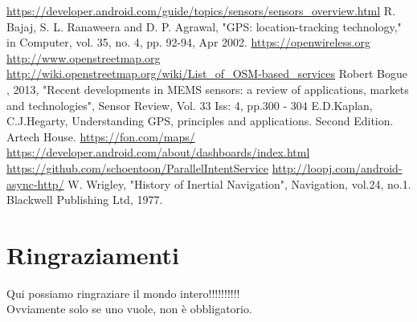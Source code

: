 \documentclass[12pt,a4paper,openright,twoside]{report}
\begin{document}
\begin{thebibliography}{90}
 \url{https://developer.android.com/guide/topics/sensors/sensors_overview.html}
 R. Bajaj, S. L. Ranaweera and D. P. Agrawal, "GPS: location-tracking technology," in Computer, vol. 35, no. 4, pp. 92-94, Apr 2002.
 \url{https://openwireless.org}
 \url{http://www.openstreetmap.org}
 \url{http://wiki.openstreetmap.org/wiki/List_of_OSM-based_services}
 Robert Bogue , 2013, "Recent developments in MEMS sensors: a review of applications, markets and technologies", Sensor Review, Vol. 33 Iss: 4, pp.300 - 304
 E.D.Kaplan, C.J.Hegarty, Understanding GPS, principles and applications. Second Edition. Artech House.
 \url{https://fon.com/maps/}
 \url{https://developer.android.com/about/dashboards/index.html}
 \url{https://github.com/schoentoon/ParallelIntentService}
 \url{http://loopj.com/android-async-http/}
 W. Wrigley, "History of Inertial Navigation", Navigation, vol.24, no.1. Blackwell Publishing Ltd, 1977.

\end{thebibliography}
\clearpage{\pagestyle{empty}\cleardoublepage}
\chapter*{Ringraziamenti}
\thispagestyle{empty}
Qui possiamo ringraziare il mondo intero!!!!!!!!!!\\
Ovviamente solo se uno vuole, non \`e obbligatorio.
\end{document}
